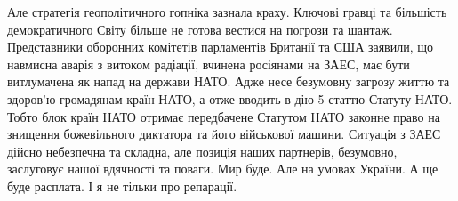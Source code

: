 Але стратегія геополітичного гопніка зазнала краху.
Ключові гравці та більшість демократичного Світу більше не готова вестися на погрози та шантаж.
Представники оборонних комітетів парламентів Британії та США заявили, що навмисна аварія з витоком радіації, вчинена росіянами на ЗАЕС, має бути витлумачена як напад на держави НАТО.
Адже несе безумовну загрозу життю та здоров’ю громадянам країн НАТО, а отже вводить в дію 5 статтю Статуту НАТО.
Тобто блок країн НАТО отримає передбачене Статутом НАТО законне право на знищення божевільного диктатора та його військової машини.
Ситуація з ЗАЕС дійсно небезпечна та складна, але позиція наших партнерів, безумовно, заслуговує нашої вдячності та поваги.
Мир буде. Але на умовах України.
А ще буде расплата. І я не тільки про репарації.
